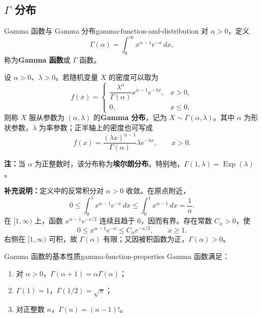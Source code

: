 \subsection*{\texorpdfstring{$\Gamma$}{Gamma} 分布}

\begin{mydefinition}{Gamma 函数与 Gamma 分布}{gamma-function-and-distribution}
对 $\alpha>0$，定义
\[
\Gamma(\alpha)=\int_0^\infty x^{\alpha-1}e^{-x}\,dx,
\]
称为\textbf{Gamma 函数}或 $\Gamma$ 函数。

设 $\alpha>0$、$\lambda>0$。若随机变量 $X$ 的密度可以取为
\[
f(x)=
\begin{cases}
\dfrac{\lambda^\alpha}{\Gamma(\alpha)}x^{\alpha-1}e^{-\lambda x},
&x>0,\\[0.5em]
0,&x\leq0,
\end{cases}
\]
则称 $X$ 服从参数为 $(\alpha,\lambda)$ 的\textbf{Gamma 分布}，记为 $X\sim\Gamma(\alpha,\lambda)$。其中 $\alpha$ 为形状参数，$\lambda$ 为率参数；正半轴上的密度也可写成
\[
f(x)=\frac{(\lambda x)^{\alpha-1}}{\Gamma(\alpha)}
\lambda e^{-\lambda x},\qquad x>0.
\]
\end{mydefinition}

\textbf{注：}\quad 当 $\alpha$ 为正整数时，该分布称为\textbf{埃尔朗分布}。特别地，$\Gamma(1,\lambda)=\operatorname{Exp}(\lambda)$。

\textbf{补充说明：}\quad 定义中的反常积分对 $\alpha>0$ 收敛。在原点附近，
\[
0\leq\int_0^1x^{\alpha-1}e^{-x}\,dx
\leq\int_0^1x^{\alpha-1}\,dx=\frac1\alpha.
\]
在 $[1,\infty)$ 上，函数 $x^{\alpha-1}e^{-x/2}$ 连续且趋于 $0$，因而有界。存在常数 $C_\alpha>0$，使
\[
0\leq x^{\alpha-1}e^{-x}\leq C_\alpha e^{-x/2},
\qquad x\geq1.
\]
右侧在 $[1,\infty)$ 可积，故 $\Gamma(\alpha)$ 有限；又因被积函数为正，$\Gamma(\alpha)>0$。

\begin{proposition}{Gamma 函数的基本性质}{gamma-function-properties}
Gamma 函数满足：
\begin{enumerate}
    \item 对 $\alpha>0$，$\Gamma(\alpha+1)=\alpha\Gamma(\alpha)$；
    \item $\Gamma(1)=1$，$\Gamma(1/2)=\sqrt\pi$；
    \item 对正整数 $n$，$\Gamma(n)=(n-1)!$。
\end{enumerate}
\end{proposition}

